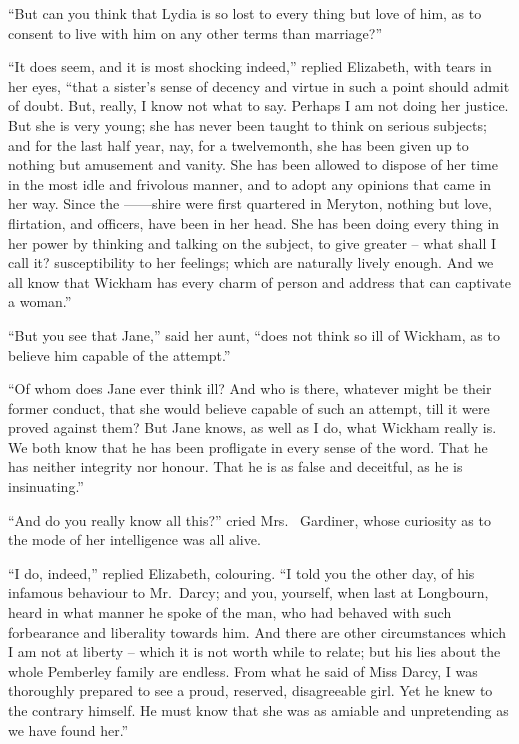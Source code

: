 “But can you think that Lydia is so lost to every thing
but love of him, as to consent to live with him on any
other terms than marriage?”

“It does seem, and it is most shocking indeed,” replied
Elizabeth, with tears in her eyes, “that a sister’s sense
of decency and virtue in such a point should admit of
doubt. But, really, I know not what to say. Perhaps
I am not doing her justice. But she is very young; she
has never been taught to think on serious subjects; and
for the last half year, nay, for a twelvemonth, she has
been given up to nothing but amusement and vanity.
She has been allowed to dispose of her time in the most
idle and frivolous manner, and to adopt any opinions
that came in her way. Since the \hbox{------shire} were first
quartered in Meryton, nothing but love, flirtation, and
officers, have been in her head. She has been doing
every thing in her power by thinking and talking on the
subject, to give greater -- what shall I call it? susceptibility
to her feelings; which are naturally lively enough.
And we all know that Wickham has every charm of
person and address that can captivate a woman.”

“But you see that Jane,” said her aunt, “does not
think so ill of Wickham, as to believe him capable of the
attempt.”

“Of whom does Jane ever think ill? And who is there,
whatever might be their former conduct, that she would
believe capable of such an attempt, till it were proved
against them? But Jane knows, as well as I do, what
Wickham really is. We both know that he has been
profligate in every sense of the word. That he has neither
integrity nor honour. That he is as false and deceitful,
as he is insinuating.”

“And do you really know all this?” cried Mrs.\ %
Gardiner, whose curiosity as to the mode of her intelligence
was all alive.

“I do, indeed,” replied Elizabeth, colouring. “I told
you the other day, of his infamous behaviour to Mr.\ Darcy;
and you, yourself, when last at Longbourn, heard in what
manner he spoke of the man, who had behaved with such
forbearance and liberality towards him. And there are
other circumstances which I am not at liberty -- which it
is not worth while to relate; but his lies about the whole
Pemberley family are endless. From what he said of
Miss Darcy, I was thoroughly prepared to see a proud,
reserved, disagreeable girl. Yet he knew to the contrary
himself. He must know that she was as amiable and
unpretending as we have found her.”

